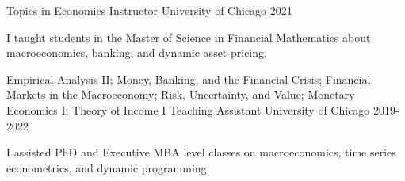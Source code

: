 

\begin{cventries}
	\cventry
	{Topics in Economics}
	{Instructor}
	{University of Chicago}
	{2021}
	{\begin{cvitems}
			\item I taught students in the Master of Science in Financial Mathematics about macroeconomics, banking, and dynamic asset pricing.
		\end{cvitems}}

	\cventry
	{Empirical Analysis II; Money, Banking, and the Financial Crisis; Financial Markets in the Macroeconomy; Risk, Uncertainty, and Value; Monetary Economics I; Theory of Income I}
	{Teaching Assistant}
	{University of Chicago}
	{2019-2022}
	{\begin{cvitems}
			\item I assisted PhD and Executive MBA level classes on macroeconomics, time series econometrics, and dynamic programming.
		\end{cvitems}}
\end{cventries}
